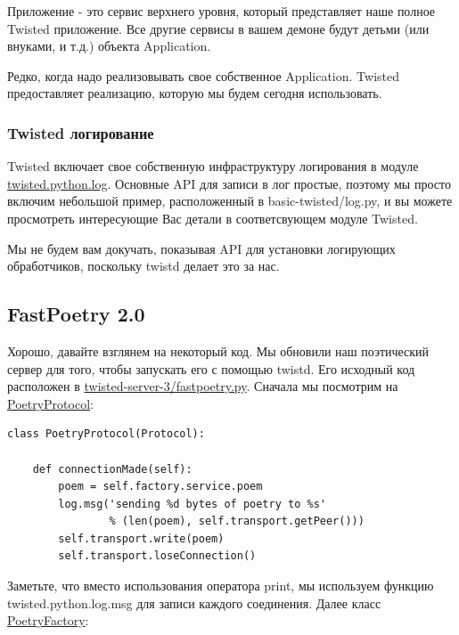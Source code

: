 Приложение - это сервис верхнего уровня, который представляет 
наше полное Twisted приложение. Все другие сервисы в вашем 
демоне будут детьми (или внуками, и т.д.) объекта Application. 


Редко, когда надо реализовывать свое собственное Application. 
Twisted предоставляет реализацию, которую мы будем 
сегодня использовать.

\subsubsection{Twisted логирование}


Twisted включает свое собственную инфраструктуру логирования в модуле 
\href{http://twistedmatrix.com/trac/browser/tags/releases/twisted-10.0.0/twisted/python/log.py}{twisted.python.log}. Основные API для записи в лог простые, поэтому мы просто 
включим небольшой пример, расположенный в 
basic-twisted/log.py, и вы можете просмотреть интересующие Вас детали 
в соответсвующем модуле Twisted.


Мы не будем вам докучать, показывая API для установки логирующих 
обработчиков, поскольку twistd делает это за нас.

\subsection{FastPoetry 2.0}

Хорошо, давайте взглянем на некоторый код. Мы обновили 
наш поэтический сервер для того, чтобы запускать его с 
помощью twistd. Его исходный код расположен в 
\href{http://github.com/jdavisp3/twisted-intro/blob/master/twisted-server-3/fastpoetry.py#L1}{twisted-server-3/fastpoetry.py}. Сначала мы посмотрим на 
\href{http://github.com/jdavisp3/twisted-intro/blob/master/twisted-server-3/fastpoetry.py#L9}{PoetryProtocol}:

\begin{scriptsize}\begin{verbatim}
class PoetryProtocol(Protocol):

    def connectionMade(self):
        poem = self.factory.service.poem
        log.msg('sending %d bytes of poetry to %s'
                % (len(poem), self.transport.getPeer()))
        self.transport.write(poem)
        self.transport.loseConnection()

\end{verbatim}\end{scriptsize}

Заметьте, что вместо использования оператора print, 
мы используем функцию twisted.python.log.msg для 
записи каждого соединения.
Далее класс \href{http://github.com/jdavisp3/twisted-intro/blob/master/twisted-server-3/fastpoetry.py#L19}{PoetryFactory}:

